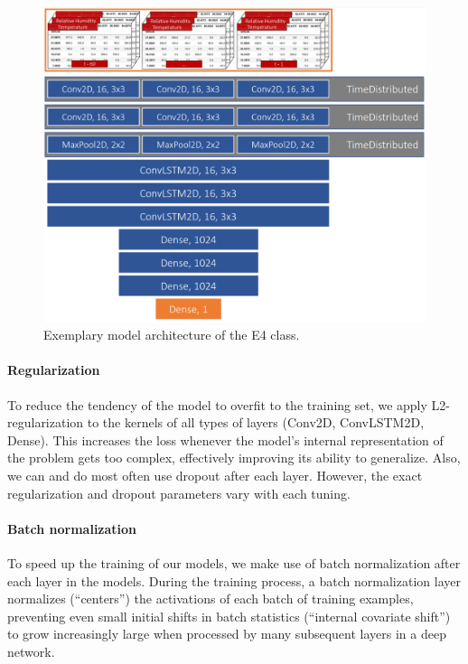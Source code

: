 \begin{figure}[h]
  \centering
  \includegraphics[width=0.8\linewidth]{./99_appendix/img/E4_architecture}
  \caption{Exemplary model architecture of the E4 class.}
  \label{fig:e4_architecture}
\end{figure}

\paragraph{Regularization} To reduce the tendency of the model to overfit to the training set, we apply L2-regularization to the kernels of all types of layers (Conv2D, ConvLSTM2D, Dense). This increases the loss whenever the model's internal representation of the problem gets too complex, effectively improving its ability to generalize. Also, we can and do most often use dropout after each layer. However, the exact regularization and dropout parameters vary with each tuning.

\paragraph{Batch normalization} To speed up the training of our models, we make use of batch normalization after each layer in the models. During the training process, a batch normalization layer normalizes (``centers'') the activations of each batch of training examples, preventing even small initial shifts in batch statistics (``internal covariate shift'') to grow increasingly large when processed by many subsequent layers in a deep network.

